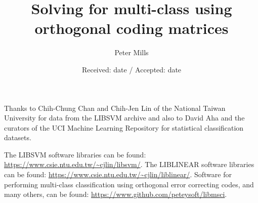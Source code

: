 \title{Solving for multi-class using orthogonal coding matrices}


\author{Peter Mills}



\date{Received: date / Accepted: date}


\maketitle

\begin{abstract}
	{\revision
	
	}
\end{abstract}



\appendix

\begin{acknowledgements}
Thanks to Chih-Chung Chan and Chih-Jen Lin of the National Taiwan University
for data from the LIBSVM archive and also to David Aha and the curators of
the UCI Machine Learning Repository for statistical classification datasets.

	The LIBSVM software libraries can be found: \url{https://www.csie.ntu.edu.tw/~cjlin/libsvm/}.
	{\revision
	The LIBLINEAR software libraries can be found: \url{https://www.csie.ntu.edu.tw/~cjlin/liblinear/}. }
	Software for performing multi-class classification using orthogonal error correcting codes, and many others, can be found: \url{https://www.github.com/peteysoft/libmsci}.

\end{acknowledgements}

